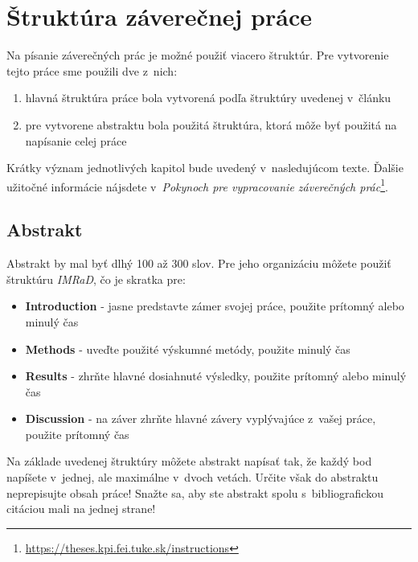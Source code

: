 
\chapter{Štruktúra záverečnej práce}\label{app:structure}

Na písanie záverečných prác je možné použiť viacero štruktúr. Pre vytvorenie tejto práce sme použili dve z~nich:

\begin{enumerate}
    \item hlavná štruktúra práce bola vytvorená podľa štruktúry uvedenej v~článku
    \item pre vytvorene abstraktu bola použitá štruktúra, ktorá môže byť použitá na napísanie celej práce
\end{enumerate}

Krátky význam jednotlivých kapitol bude uvedený v~nasledujúcom texte. Ďalšie užitočné informácie nájsdete v~\emph{Pokynoch pre vypracovanie záverečných prác}\footnote{\url{https://theses.kpi.fei.tuke.sk/instructions}}.


\section*{Abstrakt}


Abstrakt by mal byť dlhý 100 až 300 slov. Pre jeho organizáciu môžete použiť štruktúru \emph{IMRaD}, čo je skratka pre:

\begin{itemize}
    \item \textbf{Introduction} - jasne predstavte zámer svojej práce, použite prítomný alebo minulý čas
    \item \textbf{Methods} - uveďte použité výskumné metódy, použite minulý čas
    \item \textbf{Results} - zhrňte hlavné dosiahnuté výsledky, použite prítomný alebo minulý čas
    \item \textbf{Discussion} - na záver zhrňte hlavné závery vyplývajúce z~vašej práce, použite prítomný čas
\end{itemize}

Na základe uvedenej štruktúry môžete abstrakt napísať tak, že každý bod napíšete v~jednej, ale maximálne v~dvoch vetách. Určite však do abstraktu neprepisujte obsah práce! Snažte sa, aby ste abstrakt spolu s~bibliografickou citáciou mali na jednej strane!


